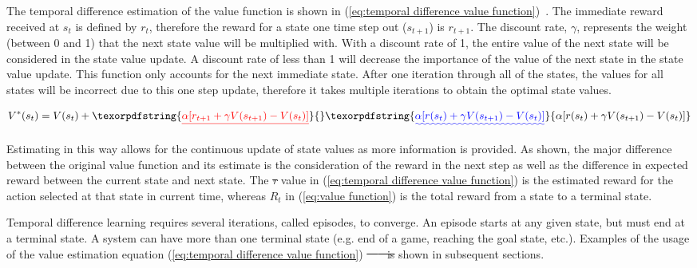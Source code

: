 \documentclass[12pt,american]{report}
\providecommand{\DIFaddtex}[1]{{\protect\color{blue}\uwave{#1}}} %
\providecommand{\DIFdeltex}[1]{{\protect\color{red}\sout{#1}}}                      %
\providecommand{\DIFaddbegin}{} %
\providecommand{\DIFaddend}{} %
\providecommand{\DIFdelbegin}{} %
\providecommand{\DIFdelend}{} %
\providecommand{\DIFadd}[1]{\texorpdfstring{\DIFaddtex{#1}}{#1}} %
\providecommand{\DIFdel}[1]{\texorpdfstring{\DIFdeltex{#1}}{}} %
\newcommand{\DIFscaledelfig}{0.5}
\newlength{\DIFdelgraphicswidth} %
\newlength{\DIFdelgraphicsheight} %
\newcommand{\DIFaddincludegraphics}[2][]{{\color{blue}\fbox{\DIFOincludegraphics[#1]{#2}}}} %
\newcommand{\DIFdelincludegraphics}[2][]{%
\sbox{\DIFdelgraphicsbox}{\DIFOincludegraphics[#1]{#2}}%
\settoboxwidth{\DIFdelgraphicswidth}{\DIFdelgraphicsbox} %
\settoboxtotalheight{\DIFdelgraphicsheight}{\DIFdelgraphicsbox} %
\scalebox{\DIFscaledelfig}{%
\parbox[b]{\DIFdelgraphicswidth}{\usebox{\DIFdelgraphicsbox}\\[-\baselineskip] \rule{\DIFdelgraphicswidth}{0em}}\llap{\resizebox{\DIFdelgraphicswidth}{\DIFdelgraphicsheight}{%
\setlength{\unitlength}{\DIFdelgraphicswidth}%
\begin{picture}(1,1)%
\thicklines\linethickness{2pt} %
{\color[rgb]{1,0,0}\put(0,0){\framebox(1,1){}}}%
{\color[rgb]{1,0,0}\put(0,0){\line( 1,1){1}}}%
{\color[rgb]{1,0,0}\put(0,1){\line(1,-1){1}}}%
\end{picture}%
}\hspace*{3pt}}} %
} %
\DeclareRobustCommand{\DIFaddbegin}{\DIFOaddbegin \let\includegraphics\DIFaddincludegraphics} %
\DeclareRobustCommand{\DIFaddend}{\DIFOaddend \let\includegraphics\DIFOincludegraphics} %
\DeclareRobustCommand{\DIFdelbegin}{\DIFOdelbegin \let\includegraphics\DIFdelincludegraphics} %
\DeclareRobustCommand{\DIFdelend}{\DIFOaddend \let\includegraphics\DIFOincludegraphics} %
\begin{document}
The temporal difference estimation of the value function is shown in (\ref{eq:temporal difference value function})~\cite{Eden}. The immediate reward received at \textit{$s_t$} is defined by \textit{$r_t$}, therefore the reward for a state one time step out (\textit{$s_{t+1}$}) is \textit{$r_{t+1}$}. The discount rate, \textit{$\gamma$}, represents the weight (between 0 and 1) that the next state value will be multiplied with.  With a discount rate of 1, the entire value of the next state will be considered in the state value update. A discount rate of less than 1 will decrease the importance of the value of the next state in the state value update.  This function only accounts for the next immediate state.  After one iteration through all of the states, the values for all states will be incorrect due to this one step update, therefore it takes multiple iterations to obtain the optimal state values.

        \begin{equation}
            \label{eq:temporal difference value function}
            V^*(s_{t}) = V(s_{t}) + \DIFdelbegin \DIFdel{\alpha[r_{t+1} + \gamma V(s_{t+1})-V(s_{t})]
        }\DIFdelend \DIFaddbegin \DIFadd{\alpha[r(s_{t}) + \gamma V(s_{t+1})-V(s_{t})]
        }\DIFaddend \end{equation}

        Estimating in this way allows for the continuous update of state values as more information is provided. As shown, the major difference between the original value function and its estimate is the consideration of the reward in the next step as well as the difference in expected reward between the current state and next state. The \textit{\DIFdelbegin \DIFdel{r}\DIFdelend \DIFaddbegin \DIFadd{$r(s_t)$}\DIFaddend } value in (\ref{eq:temporal difference value function}) is the estimated reward for the action selected at that state in current time, whereas \textit{$R_t$} in (\ref{eq:value function}) is the total reward from a state to a terminal state. 

Temporal difference learning requires several iterations, called episodes, to converge. An episode starts at any given state, but must end at a terminal state.  A system can have more than one terminal state (e.g. end of a game, reaching the goal state, etc.). Examples of the usage of the value estimation equation (\ref{eq:temporal difference value function}) \DIFdelbegin \DIFdel{~\mbox{%
\cite{Eden} }%
is }\DIFdelend \DIFaddbegin \DIFadd{are }\DIFaddend shown in subsequent sections.
\end{document}

